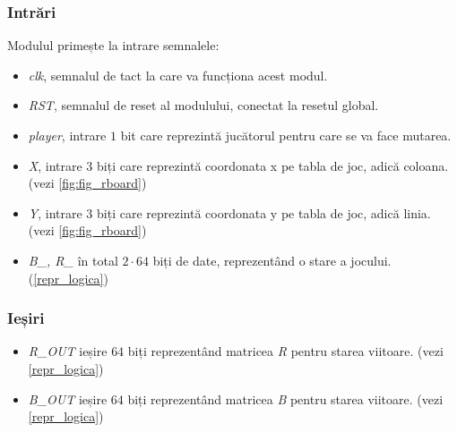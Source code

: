 \documentclass[12pt,twoside,a4paper,fleqn]{book}
\theoremstyle{definition}
\begin{document}
\subsubsection{Intrări}
Modulul primește la intrare semnalele:
\begin{itemize}
\item \emph{clk}, semnalul de tact la care va funcționa acest modul.
\item \emph{RST}, semnalul de reset al modulului, conectat la resetul global.
\item \emph{player}, intrare $1$ bit care reprezintă jucătorul pentru care se va face mutarea.
\item \emph{X}, intrare $3$ biți care reprezintă coordonata x pe tabla de joc, adică coloana. (vezi \ref{fig:fig_rboard})
\item \emph{Y}, intrare $3$ biți care reprezintă coordonata y pe tabla de joc, adică linia. (vezi \ref{fig:fig_rboard})
\item \emph{B\_, R\_} în total $2 \cdot 64$ biți de date, reprezentând o stare a jocului. (\ref{repr_logica})
\end{itemize}

\subsubsection{Ieșiri}
\begin{itemize}
\item \emph{R\_OUT} ieșire $64$ biți reprezentând matricea \emph{R} pentru starea viitoare. (vezi \ref{repr_logica})
\item \emph{B\_OUT} ieșire $64$ biți reprezentând matricea \emph{B} pentru starea viitoare. (vezi \ref{repr_logica})
\end{itemize}
\end{document}
